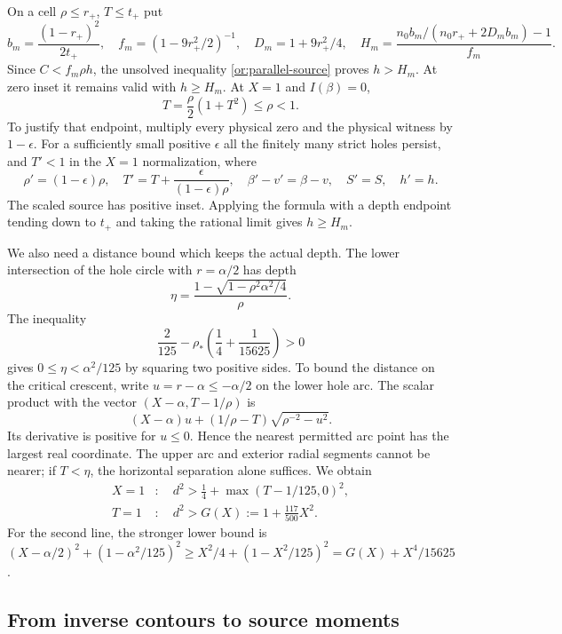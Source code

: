 On a cell $\rho\le r_+$, $T\le t_+$ put
\begin{equation}\label{or:moving-field}
 b_m=\frac{(1-r_+)^2}{2t_+},\quad
 f_m=(1-9r_+^2/2)^{-1},\quad D_m=1+9r_+^2/4,\quad
 H_m=\frac{n_0b_m/(n_0r_++2D_mb_m)-1}{f_m}.
\end{equation}
Since $C<f_m\rho h$, the unsolved inequality
\eqref{or:parallel-source} proves $h>H_m$.  At zero inset it remains
valid with $h\ge H_m$.
At $X=1$ and $I(\beta)=0$,
\[
             T=\frac\rho2(1+T^2)\le\rho<1.
\]
To justify that endpoint, multiply every physical zero and the physical
witness by $1-\epsilon$.  For a sufficiently small positive $\epsilon$
all the finitely many strict holes persist, and $T'<1$ in the
$X=1$ normalization, where
\begin{equation}\label{or:homothety}
 \rho'=(1-\epsilon)\rho,\quad
 T'=T+\frac{\epsilon}{(1-\epsilon)\rho},\quad
 \beta'-v'=\beta-v,\quad S'=S,\quad h'=h.
\end{equation}
The scaled source has positive inset.  Applying the formula with a
depth endpoint tending down to $t_+$ and taking the rational limit
gives $h\ge H_m$.

We also need a distance bound which keeps the actual depth.  The lower
intersection of the hole circle with $r=\alpha/2$ has depth
\[
             \eta=\frac{1-\sqrt{1-\rho^2\alpha^2/4}}{\rho}.
\]
The inequality
\begin{equation}\label{or:height-gate}
 \frac2{125}-\rho_*\left(\frac14+\frac1{15625}\right)>0
\end{equation}
gives $0\le\eta<\alpha^2/125$ by squaring two positive sides.
To bound the distance on the critical crescent, write
$u=r-\alpha\le-\alpha/2$ on the lower hole arc.  The scalar
product with the vector $(X-\alpha,T-1/\rho)$ is
\[
 (X-\alpha)u+(1/\rho-T)\sqrt{\rho^{-2}-u^2}.
\]
Its derivative is positive for $u\le0$.  Hence the nearest permitted
arc point has the largest real coordinate.  The upper arc and exterior
radial segments cannot be nearer; if $T<\eta$, the horizontal
separation alone suffices.  We obtain
\begin{align}
 X=1&:\quad d^2>\frac14+\max(T-1/125,0)^2,\label{or:gap-X}\\
 T=1&:\quad d^2>G(X):=1+\frac{117}{500}X^2.\label{or:gap-T}
\end{align}
For the second line, the stronger lower bound is
$(X-\alpha/2)^2+(1-\alpha^2/125)^2
 \ge X^2/4+(1-X^2/125)^2
 =G(X)+X^4/15625$.

\subsection{From inverse contours to source moments}

